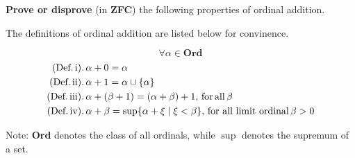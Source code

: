 \documentclass[answers]{exam}
\begin{document}
\begin{questions}
\newpage



\question \textbf{Prove or disprove} (in \textbf{ZFC}) the following properties of ordinal addition. 

The definitions of ordinal addition are listed below for convinence.

$$\forall\alpha\in \textbf{Ord}$$
\begin{align*}
\textrm{(Def.\,i)}&.\,\alpha+0=\alpha\\
\textrm{(Def.\,ii)}&.\,\alpha+1=\alpha\cup\{\alpha\}\\
\textrm{(Def.\,iii)}&.\,\alpha+(\beta+1)=(\alpha+\beta)+1,\,\mathrm{for\,all}\,\beta\\
\textrm{(Def.\,iv)}&.\,\alpha+\beta=\sup\{\alpha+\xi\mid\xi<\beta\},\,\textrm{for all limit ordinal}\,\beta>0\\
\end{align*}

Note: \textbf{Ord} denotes the class of all ordinals, while $\sup$ denotes the supremum of a set.

\end{questions}
\end{document}
